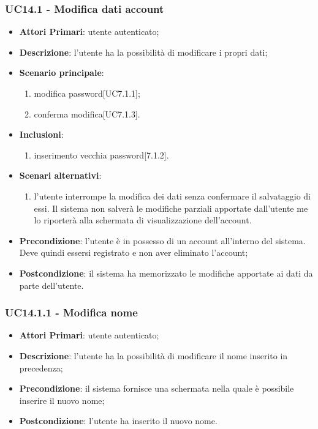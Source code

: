 \subsubsection{UC14.1 - Modifica dati account}
\begin{itemize}
	\item \textbf{Attori Primari}: utente autenticato;
	\item \textbf{Descrizione}: l'utente ha la possibilità di modificare i propri dati;
	\item \textbf{Scenario principale}:
	\begin{enumerate}
	\item modifica  password[UC7.1.1];
	\item conferma modifica[UC7.1.3].
	\end{enumerate}
	\item \textbf{Inclusioni}:
	\begin{enumerate}
	\item inserimento vecchia password[7.1.2].
	\end{enumerate}
	\item \textbf{Scenari alternativi}:
	\begin{enumerate}
	\item l'utente interrompe la modifica dei dati senza confermare il salvataggio di essi. Il sistema non salverà le modifiche parziali apportate dall'utente me lo riporterà alla schermata di visualizzazione dell'account.
	\end{enumerate}	 
	\item \textbf{Precondizione}: l'utente è in possesso di un account all'interno del sistema. Deve quindi essersi registrato e non aver eliminato l'account;
	\item \textbf{Postcondizione}: il sistema ha memorizzato le modifiche apportate ai dati da parte dell’utente.
\end{itemize}

\subsubsection{UC14.1.1 - Modifica nome}
\begin{itemize}
	\item \textbf{Attori Primari}: utente autenticato;
	\item \textbf{Descrizione}: l'utente ha la possibilità di modificare il nome inserito in precedenza;
	\item \textbf{Precondizione}: il sistema fornisce una schermata nella quale è possibile inserire il nuovo nome;
	\item \textbf{Postcondizione}: l'utente ha inserito il nuovo nome.
\end{itemize}

